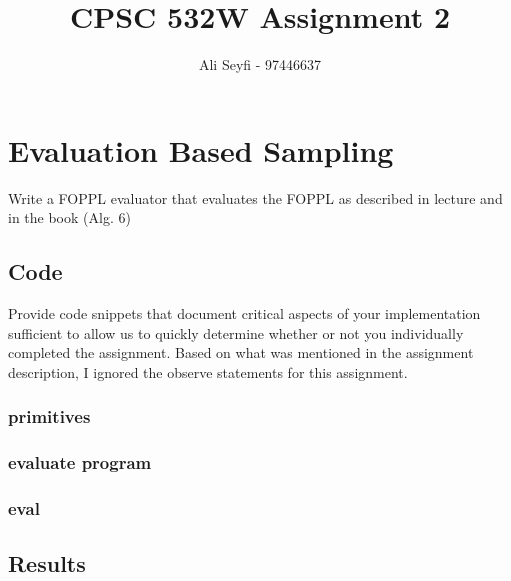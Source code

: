 \documentclass{article}
\def\blu#1{{\color{blu}#1}}
\def\red#1{{\color{red}#1}}
\begin{document}
\title{\vspace{-20mm}
CPSC 532W Assignment 2}
\author{Ali Seyfi - 97446637}
\date{}
\maketitle

\section{Evaluation Based Sampling}

\blu{Write a FOPPL evaluator that evaluates the FOPPL as described in lecture and in the book (Alg. 6)}

\subsection{Code}
\blu{Provide code snippets that document critical aspects of your implementation sufficient to allow us to quickly determine whether or not you individually completed the assignment.}
\red{Based on what was mentioned in the assignment description, I ignored the observe statements for this assignment.} 
\subsubsection{primitives}
\label{primitives}

\pagebreak

\pagebreak


\pagebreak
\subsubsection{evaluate program}

\subsubsection{eval}

\subsection{Results}
\end{document}
